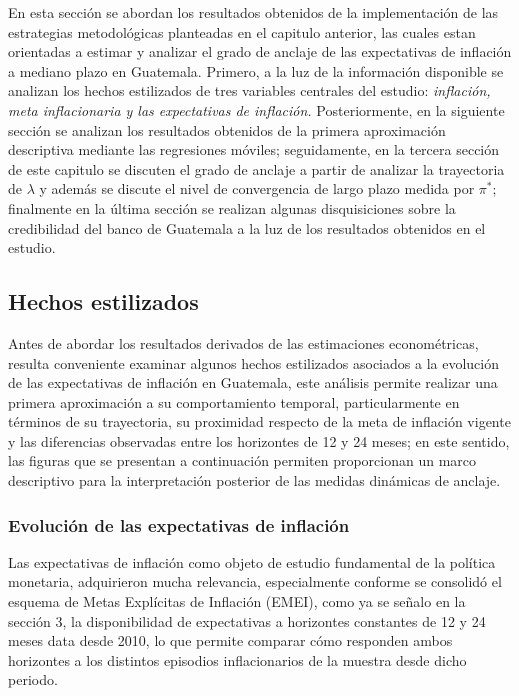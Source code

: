 \documentclass[
  10.5pt,
  letterpaper,
  twocolumn]{article}
\begin{document}
En esta sección se abordan los resultados obtenidos de la implementación
de las estrategias metodológicas planteadas en el capitulo anterior, las
cuales estan orientadas a estimar y analizar el grado de anclaje de las
expectativas de inflación a mediano plazo en Guatemala. Primero, a la
luz de la información disponible se analizan los hechos estilizados de
tres variables centrales del estudio: \emph{inflación, meta
inflacionaria y las expectativas de inflación.} Posteriormente, en la
siguiente sección se analizan los resultados obtenidos de la primera
aproximación descriptiva mediante las regresiones móviles; seguidamente,
en la tercera sección de este capitulo se discuten el grado de anclaje a
partir de analizar la trayectoria de \(\lambda\) y además se discute el
nivel de convergencia de largo plazo medida por \(\pi^{*}\); finalmente
en la última sección se realizan algunas disquisiciones sobre la
credibilidad del banco de Guatemala a la luz de los resultados obtenidos
en el estudio.

\subsection{Hechos estilizados}\label{hechos-estilizados}

Antes de abordar los resultados derivados de las estimaciones
econométricas, resulta conveniente examinar algunos hechos estilizados
asociados a la evolución de las expectativas de inflación en Guatemala,
este análisis permite realizar una primera aproximación a su
comportamiento temporal, particularmente en términos de su trayectoria,
su proximidad respecto de la meta de inflación vigente y las diferencias
observadas entre los horizontes de 12 y 24 meses; en este sentido, las
figuras que se presentan a continuación permiten proporcionan un marco
descriptivo para la interpretación posterior de las medidas dinámicas de
anclaje.

\subsubsection{Evolución de las expectativas de
inflación}\label{evoluciuxf3n-de-las-expectativas-de-inflaciuxf3n}

Las expectativas de inflación como objeto de estudio fundamental de la
política monetaria, adquirieron mucha relevancia, especialmente conforme
se consolidó el esquema de Metas Explícitas de Inflación (EMEI), como ya
se señalo en la sección 3, la disponibilidad de expectativas a
horizontes constantes de 12 y 24 meses data desde 2010, lo que permite
comparar cómo responden ambos horizontes a los distintos episodios
inflacionarios de la muestra desde dicho periodo.
\end{document}
